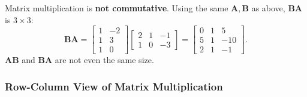 \begin{remark}
  Matrix multiplication is \textbf{not commutative}. Using the same $\mathbf{A}, \mathbf{B}$ as above, $\mathbf{B}\mathbf{A}$ is $3 \times 3$:
  \[
    \mathbf{B}\mathbf{A}
    =
    \begin{bmatrix}
      1 & -2 \\ 1 & 3 \\ 1 & 0
    \end{bmatrix}
    \begin{bmatrix}
      2 & 1 & -1 \\ 1 & 0 & -3
    \end{bmatrix}
    =
    \begin{bmatrix}
      0 & 1 & 5 \\ 5 & 1 & -10 \\ 2 & 1 & -1
    \end{bmatrix}
    .
  \]
  $\mathbf{A}\mathbf{B}$ and $\mathbf{B}\mathbf{A}$ are not even the same size.
\end{remark}

\subsubsection{Row-Column View of Matrix Multiplication}

